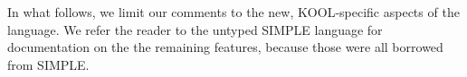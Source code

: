 \begin{kblock}[text]
In what follows, we limit our comments to the new, KOOL-specific
aspects of the language.  We refer the reader to the untyped SIMPLE
language for documentation on the the remaining features, because
those were all borrowed from SIMPLE.
\end{kblock}

\vspace*{3ex}
